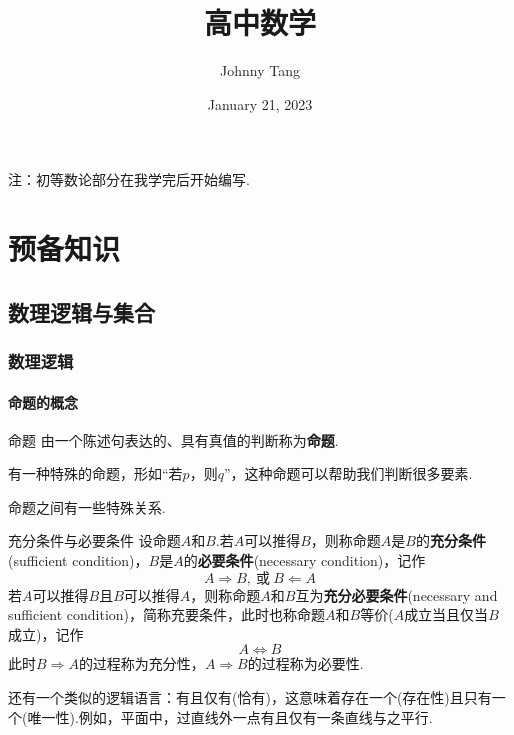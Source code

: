 \documentclass[lang=cn, zihao=4.5]{elegantbook}
\title{高中数学}
\author{Johnny Tang}
\institute{DEEP Team}
\date{January 21, 2023}
\begin{document}
\maketitle

\frontmatter

\mainmatter

\tableofcontents

注：初等数论部分在我学完后开始编写.

\newpage

\part{预备知识}

\setcounter{chapter}{-1}
\chapter{数理逻辑与集合}

\section{数理逻辑}

\subsection{命题的概念}

\begin{definition}{命题}
	由一个陈述句表达的、具有真值的判断称为\textbf{命题}.
\end{definition}
\begin{remark}
	有一种特殊的命题，形如“若$p$，则$q$”，这种命题可以帮助我们判断很多要素.
\end{remark}

命题之间有一些特殊关系.

\begin{definition}{充分条件与必要条件} %
	设命题$A$和$B$.若$A$可以推得$B$，则称命题$A$是$B$的\textbf{充分条件}(sufficient condition)，$B$是$A$的\textbf{必要条件}(necessary condition)，记作$$A \Rightarrow B,~\text{或}~B \Leftarrow A$$
	若$A$可以推得$B$且$B$可以推得$A$，则称命题$A$和$B$互为\textbf{充分必要条件}(necessary and sufficient condition)，简称充要条件，此时也称命题$A$和$B$等价($A$成立当且仅当$B$成立)，记作$$A \Leftrightarrow B$$
	此时$B \Rightarrow A$的过程称为充分性，$A \Rightarrow B$的过程称为必要性.
\end{definition}
\begin{remark}
	还有一个类似的逻辑语言：有且仅有(恰有)，这意味着存在一个(存在性)且只有一个(唯一性).例如，平面中，过直线外一点有且仅有一条直线与之平行.
\end{remark}
\end{document}
